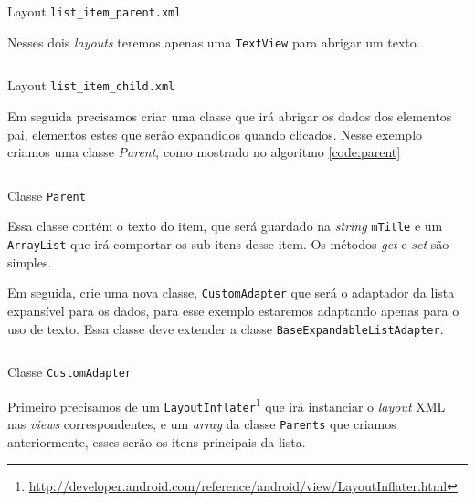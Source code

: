 \documentclass[a4paper,12pt,brazil]{book}
\begin{document}
\begin{singlespace}
\begin{listing}[H]
\inputminted[linenos=true,fontsize=\small,frame=lines, framesep=2mm, tabsize=2,numbersep=5pt]{xml}{src/design/list-item-parent.xml}
\caption{Layout \texttt{list\_item\_parent.xml}}
\end{listing}	

Nesses dois \emph{layouts} teremos apenas uma \texttt{TextView} para abrigar um texto.

\begin{listing}[H]
\inputminted[linenos=true,fontsize=\small,frame=lines, framesep=2mm, tabsize=2,numbersep=5pt]{xml}{src/design/list-item-child.xml}
\caption{Layout \texttt{list\_item\_child.xml}}
\end{listing}	

Em seguida precisamos criar uma classe que irá abrigar os dados dos elementos pai, elementos estes que serão expandidos quando clicados. Nesse exemplo criamos uma classe \emph{Parent}, como mostrado no algoritmo \ref{code:parent}

\begin{listing}[H]
\inputminted[linenos=true,fontsize=\small,frame=lines, framesep=2mm, tabsize=2,numbersep=5pt]{java}{src/design/parent.java}
\caption{Classe \texttt{Parent}}
\label{code:parent}
\end{listing}	

Essa classe contém o texto do item, que será guardado na \emph{string} \texttt{mTitle} e um \texttt{ArrayList} que irá comportar os sub-itens desse item. Os métodos \emph{get} e \emph{set} são simples.

Em seguida, crie uma nova classe, \texttt{CustomAdapter} que será o adaptador da lista expansível para os dados, para esse exemplo estaremos adaptando apenas para o uso de texto. Essa classe deve extender a classe \texttt{BaseExpandableListAdapter}.

\newenvironment{code}{\captionsetup{type=listing}}{}

\begin{code}
\inputminted[linenos=true,fontsize=\small,frame=lines, framesep=2mm, tabsize=2,numbersep=5pt]{java}{src/design/customadapter.java}
\caption{Classe \texttt{CustomAdapter}}
\end{code}

\parskip 1pt 

Primeiro precisamos de um \texttt{LayoutInflater}\footnote{\href{http://developer.android.com/reference/android/view/LayoutInflater.html}{http://developer.android.com/reference/android/view/LayoutInflater.html}} que irá instanciar o \emph{layout} XML nas \emph{views} correspondentes, e um \emph{array} da classe \texttt{Parents} que criamos anteriormente, esses serão os itens principais da lista.


\end{singlespace}
\end{document}
